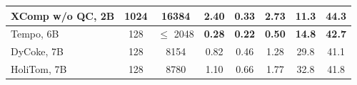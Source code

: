 \begin{table}[h]
{\begin{tabular}{l ccccccc}
        \rowcolor{blue!10} XComp w/o QC, 2B      & 1024 & 16384 & 2.40 & 0.33 & 2.73 & \textbf{11.3} & 44.3 \\
        \midrule
        \rowcolor{yellow!15} Tempo, 6B      & 128    & $\leq$ 2048 & \textbf{0.28} & \textbf{0.22} & \textbf{0.50} & \textbf{14.8} & \textbf{42.7} \\
        \rowcolor{yellow!15} DyCoke, 7B     & 128    & 8154        & 0.82 & 0.46 & 1.28 & 29.8 & 41.1 \\
        \rowcolor{yellow!15} HoliTom, 7B    & 128    & 8780        & 1.10 & 0.66 & 1.77 & 32.8 & 41.8 \\
        \bottomrule
    \end{tabular}
    }
    \label{tab:rebuttal}
\end{table}